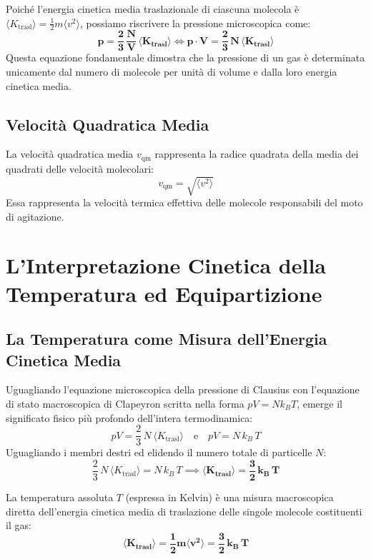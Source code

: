 \documentclass[11pt,a4paper,oneside]{report}
\begin{document}
Poiché l'energia cinetica media traslazionale di ciascuna molecola è $\langle K_{\text{trasl}} \rangle = \frac{1}{2} m \langle v^2 \rangle$, possiamo riscrivere la pressione microscopica come:
\[
\mathbf{p = \frac{2}{3} \, \frac{N}{V} \, \langle K_{\text{trasl}} \rangle \iff p \cdot V = \frac{2}{3} \, N \, \langle K_{\text{trasl}} \rangle}
\]
Questa equazione fondamentale dimostra che la pressione di un gas è determinata unicamente dal numero di molecole per unità di volume e dalla loro energia cinetica media.

\section{Velocità Quadratica Media}
La velocità quadratica media $v_{\text{qm}}$ rappresenta la radice quadrata della media dei quadrati delle velocità molecolari:
\[
v_{\text{qm}} = \sqrt{\langle v^2 \rangle}
\]
Essa rappresenta la velocità termica effettiva delle molecole responsabili del moto di agitazione.

\chapter{L'Interpretazione Cinetica della Temperatura ed Equipartizione}

\section{La Temperatura come Misura dell'Energia Cinetica Media}
Uguagliando l'equazione microscopica della pressione di Clausius con l'equazione di stato macroscopica di Clapeyron scritta nella forma $p V = N k_B T$, emerge il significato fisico più profondo dell'intera termodinamica:
\[
p V = \frac{2}{3} \, N \, \langle K_{\text{trasl}} \rangle \quad \text{e} \quad p V = N \, k_B \, T
\]
Uguagliando i membri destri ed elidendo il numero totale di particelle $N$:
\[
\frac{2}{3} \, N \, \langle K_{\text{trasl}} \rangle = N \, k_B \, T \implies \mathbf{\langle K_{\text{trasl}} \rangle = \frac{3}{2} \, k_B \, T}
\]

\begin{leggefisica}
La temperatura assoluta $T$ (espressa in Kelvin) è una misura macroscopica diretta dell'energia cinetica media di traslazione delle singole molecole costituenti il gas:
\[
\mathbf{\langle K_{\text{trasl}} \rangle = \frac{1}{2} m \langle v^2 \rangle = \frac{3}{2} \, k_B \, T}
\]
\end{leggefisica}
\end{document}
